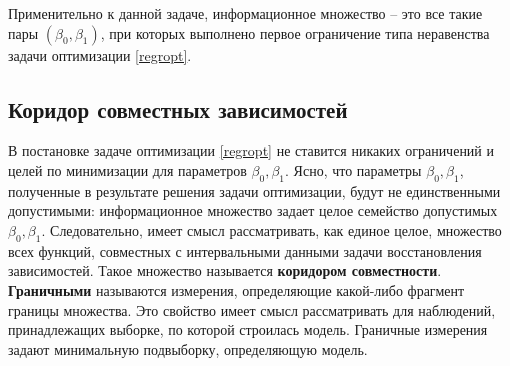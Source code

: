 Применительно к данной задаче, информационное множество -- это все такие пары $(\beta_0, \beta_1)$, при которых выполнено первое ограничение типа неравенства задачи оптимизации \ref{regropt}.


\subsection{Коридор совместных зависимостей}

В постановке задаче оптимизации \ref{regropt} не ставится никаких ограничений и целей по минимизации для параметров $\beta_0, \beta_1$. Ясно, что параметры $\beta_0, \beta_1$, полученные в результате решения задачи оптимизации, будут не единственными допустимыми: информационное множество задает целое семейство допустимых $\beta_0, \beta_1$. Следовательно, имеет смысл рассматривать, как единое целое, множество всех функций, совместных с интервальными данными задачи восстановления зависимостей. Такое множество называется \textbf{коридором совместности}.
\textbf{Граничными} называются измерения, определяющие какой-либо фрагмент границы множества. Это свойство имеет смысл рассматривать для наблюдений, принадлежащих выборке, по которой строилась модель. Граничные измерения задают минимальную подвыборку, определяющую модель.